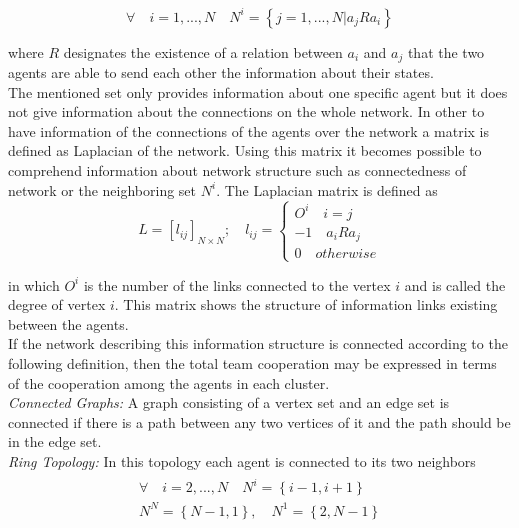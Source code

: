 \documentclass[conference]{IEEEtran}
\begin{document}
\begin{equation}\label{eq:setOfNeighbors}
\forall \quad i=1,...,N \quad  N^{i}=\left\{j=1,...,N|a_{j}Ra_{i}\right\}
\end{equation}

where $R$ designates the existence of a relation between $a_{i}$ and $a_{j}$ that the two agents are able to send each other the information about their states.\\

The mentioned set only provides information about one specific agent but it does not give information about the connections on the whole network. In other to have information of the connections of the agents over the network a matrix is defined as Laplacian of the network. Using this matrix it becomes possible to comprehend information about network structure such as connectedness of network or the neighboring set $N^{i}$. The Laplacian matrix is defined as
\begin{equation}\label{eq:laplacian}
L=[l_{ij}]_{N\times N}; \quad l_{ij}=
  \begin{cases}
  O^{i} \quad i=j\\
  -1 \quad a_{i}Ra_{j}\\
  0 \quad otherwise
  \end{cases}
\end{equation}

in which $O^{i}$ is the number of the links connected to the vertex $i$ and is called the degree of vertex $i$. This matrix shows the structure of information links existing between the agents.\\
If the network describing this information structure is connected according to the following definition, then the total team cooperation may be expressed in terms of the cooperation among the agents in each cluster.\\
\textit{Connected Graphs:} A graph consisting of a vertex set and an edge set is connected if there is a path between any two vertices of it and the path should be in the edge set.\\
\textit{Ring Topology:} In this topology each agent is connected to its two neighbors
\begin{multline}\label{eq:ringTopology}
\begin{split}
\forall \quad i=2,...,N \quad  N^{i}=\left\{i-1,i+1\right\}\\
N^{N}=\left\{N-1,1\right\}, \quad N^{1}=\left\{2,N-1\right\}
\end{split}
\end{multline}
\end{document}
